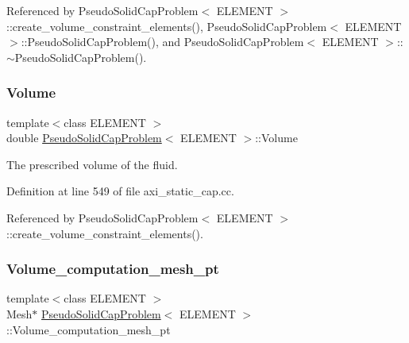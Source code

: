 Referenced by Pseudo\+Solid\+Cap\+Problem$<$ E\+L\+E\+M\+E\+N\+T $>$\+::create\+\_\+volume\+\_\+constraint\+\_\+elements(), Pseudo\+Solid\+Cap\+Problem$<$ E\+L\+E\+M\+E\+N\+T $>$\+::\+Pseudo\+Solid\+Cap\+Problem(), and Pseudo\+Solid\+Cap\+Problem$<$ E\+L\+E\+M\+E\+N\+T $>$\+::$\sim$\+Pseudo\+Solid\+Cap\+Problem().

\mbox{\label{classPseudoSolidCapProblem_a49945d8e5740977a72c63e333a65293f}} 
\subsubsection{\texorpdfstring{Volume}{Volume}}
{\footnotesize\ttfamily template$<$class E\+L\+E\+M\+E\+NT $>$ \\
double \hyperlink{classPseudoSolidCapProblem}{Pseudo\+Solid\+Cap\+Problem}$<$ E\+L\+E\+M\+E\+NT $>$\+::Volume\hspace{0.3cm}{\ttfamily [private]}}



The prescribed volume of the fluid. 



Definition at line 549 of file axi\+\_\+static\+\_\+cap.\+cc.



Referenced by Pseudo\+Solid\+Cap\+Problem$<$ E\+L\+E\+M\+E\+N\+T $>$\+::create\+\_\+volume\+\_\+constraint\+\_\+elements().

\mbox{\label{classPseudoSolidCapProblem_aa9c678c2bfec0afcb94f356aeaa19089}} 
\subsubsection{\texorpdfstring{Volume\+\_\+computation\+\_\+mesh\+\_\+pt}{Volume\_computation\_mesh\_pt}}
{\footnotesize\ttfamily template$<$class E\+L\+E\+M\+E\+NT $>$ \\
Mesh$\ast$ \hyperlink{classPseudoSolidCapProblem}{Pseudo\+Solid\+Cap\+Problem}$<$ E\+L\+E\+M\+E\+NT $>$\+::Volume\+\_\+computation\+\_\+mesh\+\_\+pt\hspace{0.3cm}{\ttfamily [private]}}



